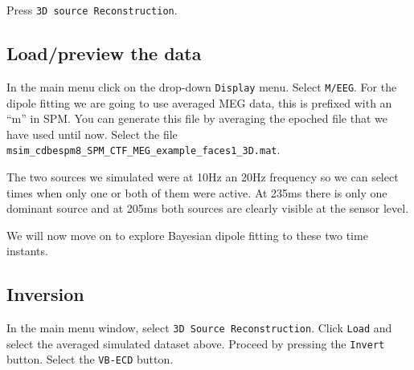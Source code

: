 Press  \texttt{3D source Reconstruction}.

\subsection{Load/preview the data}

In the main menu click on the drop-down \texttt{Display} menu. Select \texttt{M/EEG}. For the dipole fitting we are going to use averaged MEG data, this is prefixed with an ``m'' in SPM. You can generate this file by averaging the epoched file that we have used until now. Select the file \texttt{msim\_cdbespm8_SPM_CTF_MEG_example_faces1_3D.mat}.

The two sources we simulated were at 10Hz an 20Hz frequency so we can select times when only one or both of them were active.  At 235ms there is only one dominant source and at 205ms both sources are clearly visible at the sensor level.

We will now move on to explore Bayesian dipole fitting to these two time instants.

\subsection{Inversion}
In the main menu window, select \texttt{3D Source Reconstruction}. Click \texttt{Load} and select the averaged simulated dataset above.
Proceed by pressing the \texttt{Invert} button. Select the \texttt{VB-ECD} button.

